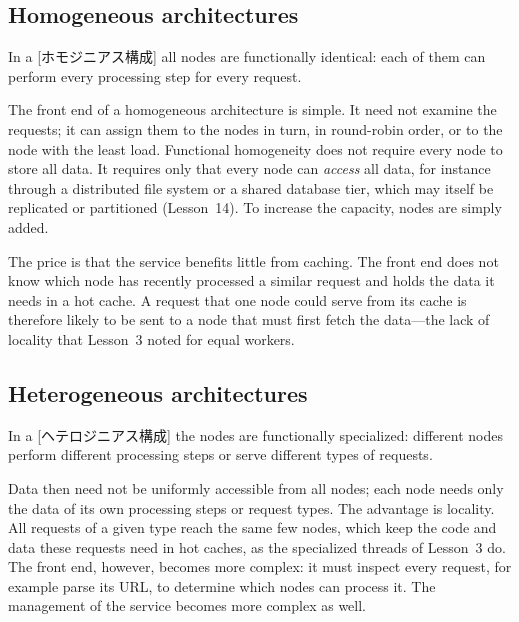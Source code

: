 \documentclass[../main.tex]{subfiles}
\begin{document}
\subsection{Homogeneous architectures}

\begin{definition}
  In a [ホモジニアス構成] all nodes are
  functionally identical: each of them can perform every processing step
  for every request.
\end{definition}

The front end of a homogeneous architecture is simple.  It need not examine
the requests; it can assign them to the nodes in turn, in round-robin order,
or to the node with the least load.  Functional homogeneity does not require
every node to store all data.  It requires only that every node can
\emph{access} all data, for instance through a distributed file system or a
shared database tier, which may itself be replicated or partitioned
(Lesson~14).  To increase the capacity, nodes are simply added.

The price is that the service benefits little from caching.  The front end
does not know which node has recently processed a similar request and holds
the data it needs in a hot cache.  A request that one node
could serve from its cache is therefore likely to be sent to a node that must
first fetch the data---the lack of locality that Lesson~3 noted for equal
workers.

\subsection{Heterogeneous architectures}

\begin{definition}
  In a [ヘテロジニアス構成] the nodes are
  functionally specialized: different nodes perform different processing
  steps or serve different types of requests.
\end{definition}

Data then need not be uniformly accessible from all nodes; each node needs
only the data of its own processing steps or request types.  The advantage
is locality.  All requests of a given type reach the same few nodes, which
keep the code and data these requests need in hot caches, as the specialized
threads of Lesson~3 do.  The front end, however,
becomes more complex: it must inspect every request, for example parse its
URL, to determine which nodes can process it.  The management of the service becomes more complex as
well.
\end{document}

